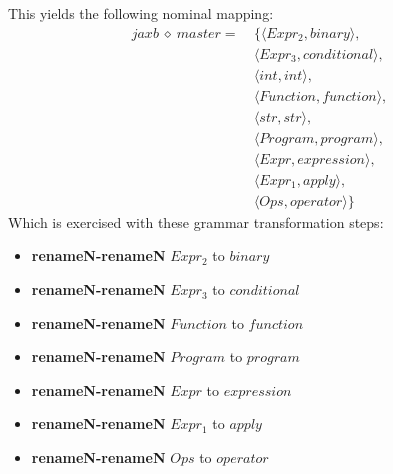 This yields the following nominal mapping:
\begin{align*}\mathit{jaxb} \:\diamond\: \mathit{master} =\:& \{\langle \mathit{Expr_2},\mathit{binary}\rangle,\\
 & \langle \mathit{Expr_3},\mathit{conditional}\rangle,\\
 & \langle int,int\rangle,\\
 & \langle \mathit{Function},\mathit{function}\rangle,\\
 & \langle str,str\rangle,\\
 & \langle \mathit{Program},\mathit{program}\rangle,\\
 & \langle \mathit{Expr},\mathit{expression}\rangle,\\
 & \langle \mathit{Expr_1},\mathit{apply}\rangle,\\
 & \langle \mathit{Ops},\mathit{operator}\rangle\}\end{align*}
 Which is exercised with these grammar transformation steps:

{\footnotesize\begin{itemize}
\item \textbf{renameN-renameN} $\mathit{Expr_2}$ to $\mathit{binary}$
\item \textbf{renameN-renameN} $\mathit{Expr_3}$ to $\mathit{conditional}$
\item \textbf{renameN-renameN} $\mathit{Function}$ to $\mathit{function}$
\item \textbf{renameN-renameN} $\mathit{Program}$ to $\mathit{program}$
\item \textbf{renameN-renameN} $\mathit{Expr}$ to $\mathit{expression}$
\item \textbf{renameN-renameN} $\mathit{Expr_1}$ to $\mathit{apply}$
\item \textbf{renameN-renameN} $\mathit{Ops}$ to $\mathit{operator}$
\end{itemize}}

